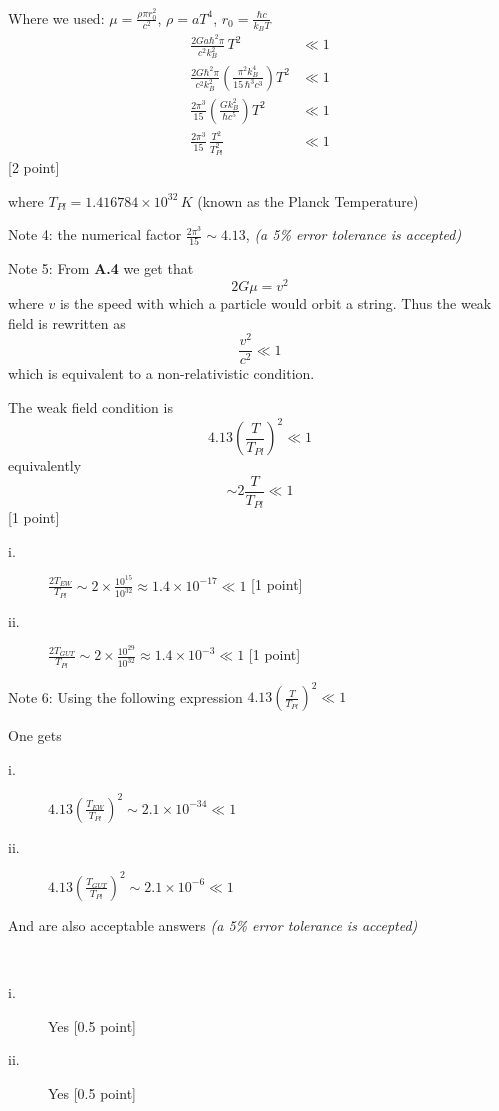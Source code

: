 \begin{description}
  Where we used: $\mu = \frac{\rho\pi r_0^2}{c^2}$, $\rho = aT^4$,
  $r_0 = \frac{\hbar c}{k_B T}$
  \begin{align*}
  \frac{2Ga\hbar^2\pi}{c^2 k_B^2}\,T^2 &\ll 1\\
  \frac{2G\hbar^2\pi}{c^2 k_B^2}
    \left(\frac{\pi^2 k_B^4}{15\,\hbar^3 c^3}\right)T^2 &\ll 1\\
  \frac{2\pi^3}{15}\left(\frac{Gk_B^2}{\hbar c^5}\right)T^2 &\ll 1\\
  \frac{2\pi^3}{15}\,\frac{T^2}{T_{Pl}^2} &\ll 1
  \end{align*}
  \hfill[2 point]

  where $T_{Pl} = 1.416784\times 10^{32}\,K$ (known as the Planck
  Temperature)

  Note 4: the numerical factor $\frac{2\pi^3}{15}\sim 4.13$,
  \emph{(a 5\% error tolerance is accepted)}

  Note 5: From \textbf{A.4} we get that
  \[ 2G\mu = v^2 \]
  where $v$ is the speed with which a particle would orbit a string. Thus
  the weak field is rewritten as
  \[ \frac{v^2}{c^2}\ll 1 \]
  which is equivalent to a non-relativistic condition.

\item[B.5] The weak field condition is
  \[ 4.13\left(\frac{T}{T_{Pl}}\right)^2\ll 1 \]
  equivalently
  \[ \sim 2\frac{T}{T_{Pl}}\ll 1 \]
  \hfill[1 point]
  \begin{description}
  \item[i.] $\frac{2T_{EW}}{T_{Pl}}\sim
    2\times\frac{10^{15}}{10^{32}}\approx 1.4\times 10^{-17}\ll 1$
    \hfill[1 point]
  \item[ii.] $\frac{2T_{GUT}}{T_{Pl}}\sim
    2\times\frac{10^{29}}{10^{32}}\approx 1.4\times 10^{-3}\ll 1$
    \hfill[1 point]
  \end{description}

  Note 6: Using the following expression
  $4.13\left(\frac{T}{T_{Pl}}\right)^2\ll 1$

  One gets
  \begin{description}
  \item[i.] $4.13\left(\frac{T_{EW}}{T_{Pl}}\right)^2
    \sim 2.1\times 10^{-34}\ll 1$
  \item[ii.] $4.13\left(\frac{T_{GUT}}{T_{Pl}}\right)^2
    \sim 2.1\times 10^{-6}\ll 1$
  \end{description}
  And are also acceptable answers \emph{(a 5\% error tolerance is
  accepted)}

\item[B.6]\
  \begin{description}
  \item[i.] Yes \hfill[0.5 point]
  \item[ii.] Yes \hfill[0.5 point]
  \end{description}
\end{description}

